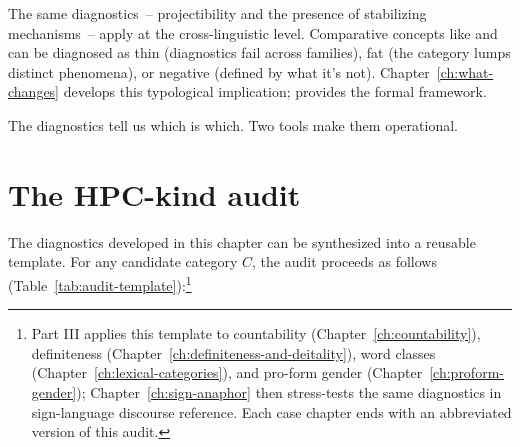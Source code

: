 The same diagnostics~-- projectibility and the presence of stabilizing mechanisms~-- apply at the cross-linguistic level. Comparative concepts like  and  can be diagnosed as thin (diagnostics fail across families), fat (the category lumps distinct phenomena), or negative (defined by what it's not). Chapter~\ref{ch:what-changes} develops this typological implication; \textcite{reynolds2025comparanda} provides the formal framework.

The diagnostics tell us which is which. Two tools make them operational.


\section{The HPC-kind audit}
\label{sec:8:audit}

The diagnostics developed in this chapter can be synthesized into a reusable template. For any candidate category $C$, the audit proceeds as follows (Table~\ref{tab:audit-template}):\footnote{Part III applies this template to countability (Chapter~\ref{ch:countability}), definiteness (Chapter~\ref{ch:definiteness-and-deitality}), word classes (Chapter~\ref{ch:lexical-categories}), and pro-form gender (Chapter~\ref{ch:proform-gender}); Chapter~\ref{ch:sign-anaphor} then stress-tests the same diagnostics in sign-language discourse reference. Each case chapter ends with an abbreviated version of this audit.}

